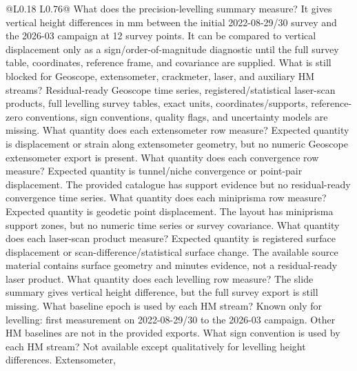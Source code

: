 \begin{longtable}{@{}L{0.18\textwidth} L{0.76\textwidth}@{}}
\toprule
{}
{ What does the precision-levelling summary measure?}
{It gives vertical height differences in mm between the initial 2022-08-29/30
survey and the 2026-03 campaign at 12 survey points.  It can be compared to
vertical displacement only as a sign/order-of-magnitude diagnostic until the full
survey table, coordinates, reference frame, and covariance are supplied.}
{ What is still blocked for Geoscope, extensometer, crackmeter, laser, and auxiliary
HM streams?}
{Residual-ready Geoscope time series, registered/statistical laser-scan products,
full levelling survey tables, exact units, coordinates/supports, reference-zero
conventions, sign conventions, quality flags, and uncertainty models are missing.}
{ What quantity does each extensometer row measure?}
{Expected quantity is displacement or strain along extensometer geometry, but no
numeric Geoscope extensometer export is present.}
{ What quantity does each convergence row measure?}
{Expected quantity is tunnel/niche convergence or point-pair displacement.  The
provided catalogue has support evidence but no residual-ready convergence time
series.}
{ What quantity does each miniprisma row measure?}
{Expected quantity is geodetic point displacement.  The layout has miniprisma support
zones, but no numeric time series or survey covariance.}
{ What quantity does each laser-scan product measure?}
{Expected quantity is registered surface displacement or scan-difference/statistical
surface change.  The available source material contains surface geometry and minutes
evidence, not a residual-ready laser product.}
{ What quantity does each levelling row measure?}
{The slide summary gives vertical height difference, but the full survey export is
still missing.}
{ What baseline epoch is used by each HM stream?}
{Known only for levelling: first measurement on 2022-08-29/30 to the 2026-03
campaign.  Other HM baselines are not in the provided exports.}
{ What sign convention is used by each HM stream?}
{Not available except qualitatively for levelling height differences.  Extensometer,
}
\end{longtable}

